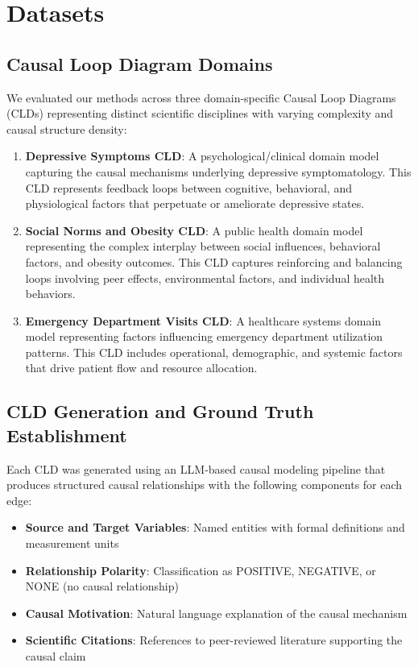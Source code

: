 \documentclass{article}
\begin{document}
\section{Datasets}

\subsection{Causal Loop Diagram Domains}

We evaluated our methods across three domain-specific Causal Loop Diagrams (CLDs) representing distinct scientific disciplines with varying complexity and causal structure density:

\begin{enumerate}
    \item \textbf{Depressive Symptoms CLD}: A psychological/clinical domain model capturing the causal mechanisms underlying depressive symptomatology. This CLD represents feedback loops between cognitive, behavioral, and physiological factors that perpetuate or ameliorate depressive states.
    
    \item \textbf{Social Norms and Obesity CLD}: A public health domain model representing the complex interplay between social influences, behavioral factors, and obesity outcomes. This CLD captures reinforcing and balancing loops involving peer effects, environmental factors, and individual health behaviors.
    
    \item \textbf{Emergency Department Visits CLD}: A healthcare systems domain model representing factors influencing emergency department utilization patterns. This CLD includes operational, demographic, and systemic factors that drive patient flow and resource allocation.
\end{enumerate}

\subsection{CLD Generation and Ground Truth Establishment}

Each CLD was generated using an LLM-based causal modeling pipeline that produces structured causal relationships with the following components for each edge:

\begin{itemize}
    \item \textbf{Source and Target Variables}: Named entities with formal definitions and measurement units
    \item \textbf{Relationship Polarity}: Classification as POSITIVE, NEGATIVE, or NONE (no causal relationship)
    \item \textbf{Causal Motivation}: Natural language explanation of the causal mechanism
    \item \textbf{Scientific Citations}: References to peer-reviewed literature supporting the causal claim
\end{itemize}
\end{document}
